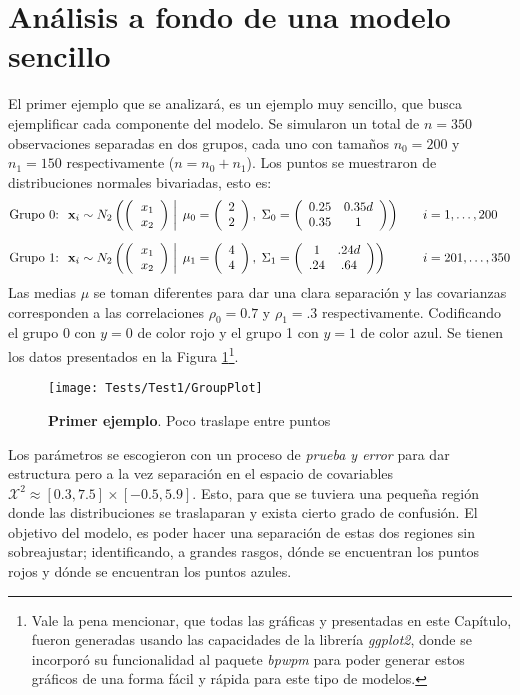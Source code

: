 \documentclass[../Main/Main.tex]{subfiles}
\begin{document}
\section{Análisis a fondo de una modelo sencillo} \label{sec:Test1}
El primer ejemplo que se analizará, es un ejemplo muy sencillo, que busca ejemplificar cada componente del modelo. Se simularon un total de $n = 350$ observaciones separadas en dos grupos, cada uno con tamaños $n_{0} = 200$ y  $n_{1} = 150$ respectivamente ($n = n_0 + n_1$). Los puntos se muestraron de distribuciones normales bivariadas, esto es:
\begin{align*}
\text{Grupo 0: } \;
&\xsn_i \sim \normbivar{2}{2}{0.25}{0.35}{1}{0} \quad
& &i = 1,\ldots,200 \\[6pt]
\text{Grupo 1: } \;
&\xsn_i \sim \normbivar{4}{4}{1}{.24}{.64}{1} \quad
& &i = 201,\ldots,350
\end{align*}
Las medias $\mu$ se toman diferentes para dar una clara separación y las covarianzas corresponden a las correlaciones $\rho_0 = 0.7$ y $\rho_1 = .3$ respectivamente. Codificando el grupo 0 con $y = 0$ de color rojo y el grupo 1 con $y = 1$ de color azul. Se tienen los datos presentados en la Figura \ref{fig:Test1Plot}\footnote{Vale la pena mencionar, que todas las gráficas y presentadas en este Capítulo, fueron generadas usando las capacidades de la librería \textit{ggplot2}, donde se incorporó su funcionalidad al paquete \textit{bpwpm} para poder generar estos gráficos de una forma fácil y rápida para este tipo de modelos.}.
\begin{figure}[h]
  \centering
      \texttt{[image: Tests/Test1/GroupPlot]}
  \caption{\textbf{Primer ejemplo}. Poco traslape entre puntos}
 \label{fig:Test1Plot}
\end{figure}
Los parámetros se escogieron con un proceso de \textit{prueba y error} para dar estructura pero a la vez separación en el espacio de covariables $\mathcal{X}^2 \approx [0.3,7.5]\times[-0.5,5.9]$. Esto, para que se tuviera una pequeña región donde las distribuciones se traslaparan y exista cierto grado de confusión. El objetivo del modelo, es poder hacer una separación de estas dos regiones sin sobreajustar; identificando, a grandes rasgos, dónde se encuentran los puntos rojos y dónde se encuentran los puntos azules.
\end{document}
